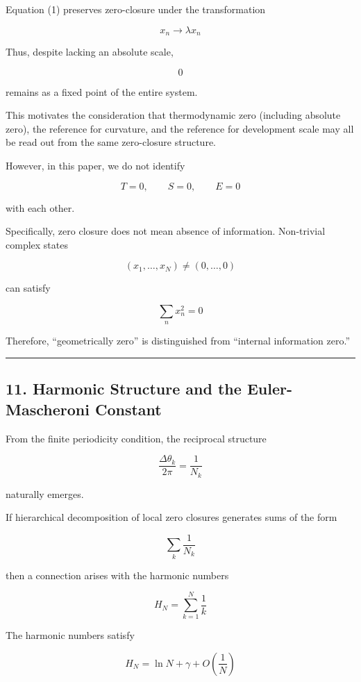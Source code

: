 \documentclass[
  a4paper,
]{article}
\begin{document}
Equation (1) preserves zero-closure under the transformation

\[
x_n\rightarrow\lambda x_n
\]

Thus, despite lacking an absolute scale,

\[
0
\]

remains as a fixed point of the entire system.

This motivates the consideration that thermodynamic zero (including
absolute zero), the reference for curvature, and the reference for
development scale may all be read out from the same zero-closure
structure.

However, in this paper, we do not identify

\[
T=0,
\qquad
S=0,
\qquad
E=0
\]

with each other.

Specifically, zero closure does not mean absence of information.
Non-trivial complex states

\[
(x_1,\ldots,x_N)\neq(0,\ldots,0)
\]

can satisfy

\[
\sum_nx_n^2=0
\]

Therefore, ``geometrically zero'' is distinguished from ``internal
information zero.''

\begin{center}\rule{0.5\linewidth}{0.5pt}\end{center}

\subsection{11. Harmonic Structure and the Euler-Mascheroni
Constant}\label{harmonic-structure-and-the-euler-mascheroni-constant}

From the finite periodicity condition, the reciprocal structure

\[
\frac{\Delta\theta_k}{2\pi}
=
\frac{1}{N_k}
\]

naturally emerges.

If hierarchical decomposition of local zero closures generates sums of
the form

\[
\sum_k\frac{1}{N_k}
\]

then a connection arises with the harmonic numbers

\[
H_N
=
\sum_{k=1}^{N}\frac{1}{k}
\]

The harmonic numbers satisfy

\[
H_N
=
\ln N+\gamma+O\left(\frac{1}{N}\right)
\]
\end{document}
